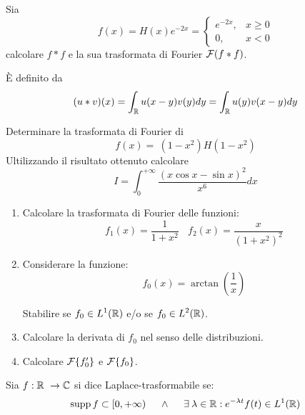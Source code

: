 Sia
\begin{equation*}
f( x) =H( x) e^{-2x} =\begin{cases}
e^{-2x} , & x\geqslant 0\\
0, & x< 0
\end{cases}
\end{equation*}
calcolare $\displaystyle f*f$ e la sua trasformata di Fourier $\displaystyle \mathcal{F} ( f*f)$.
\begin{rem}
 È definito da
\begin{equation*}
( u*v)( x) =\int _{\mathbb{R} } u( x-y) v( y) dy=\int _{\mathbb{R} } u( y) v( x-y) dy
\end{equation*}
\end{rem}
\Esercizio{}

Determinare la trasformata di Fourier di
\begin{equation*}
f( x) =\ \left( 1-x^{2}\right) H\left( 1-x^{2}\right)
\end{equation*}
Ultilizzando il risultato ottenuto calcolare
\begin{equation*}
I=\int ^{+\infty }_{0}\frac{( x\cos x-\sin x)^{2}}{x^{6}} dx
\end{equation*}
\Esercizio{}
\begin{enumerate}
\item Calcolare la trasformata di Fourier delle funzioni:\begin{equation*}
f_{1}( x) =\frac{1}{1+x^{2}} \ \ \ \ f_{2}( x) =\frac{x}{\left( 1+x^{2}\right)^{2}}
\end{equation*}
\item Considerare la funzione:\begin{equation*}
f_{0}( x) =\arctan\left(\frac{1}{x}\right)
\end{equation*}

Stabilire se $\displaystyle f_{0} \in L^{1}(\mathbb{R} )$ e/o se $\displaystyle f_{0} \in L^{2}(\mathbb{R} )$.
\item Calcolare la derivata di $\displaystyle f_{0}$ nel senso delle distribuzioni.
\item Calcolare $\mathcal{F} \{f'_{0}\}$ e $\mathcal{F} \{f_{0}\}$.
\end{enumerate}
\Esercizio{}
\begin{defn}
Sia $\displaystyle f:\mathbb{R}  \ \rightarrow \mathbb{C} $ si dice Laplace-trasformabile se:
\begin{equation*}
\supp f\subset [ 0,+\infty ) \ \ \ \ \land \ \ \ \ \exists \lambda \in \RR  :e^{-\lambda t} f( t) \in L^{1}(\RR )
\end{equation*}
\end{defn}
